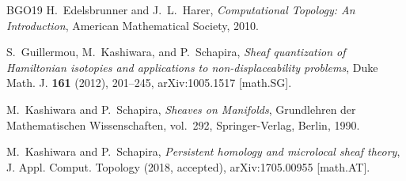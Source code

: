 \documentclass[12pt,a4paper]{amsart}
\theoremstyle{definition}
\begin{document}
\begin{thebibliography}{BGO19}
H.~Edelsbrunner and J.~L.~Harer,
\textit{Computational Topology: An Introduction},
American Mathematical Society, 2010.

S.~Guillermou, M.~Kashiwara, and P.~Schapira,
\textit{Sheaf quantization of Hamiltonian isotopies and applications to
non-displaceability problems},
Duke Math. J. \textbf{161} (2012), 201--245,
arXiv:1005.1517 [math.SG].

M.~Kashiwara and P.~Schapira,
\textit{Sheaves on Manifolds},
Grundlehren der Mathematischen Wissenschaften, vol.~292,
Springer-Verlag, Berlin, 1990.

M.~Kashiwara and P.~Schapira,
\textit{Persistent homology and microlocal sheaf theory},
J. Appl. Comput. Topology (2018, accepted),
arXiv:1705.00955 [math.AT].

\end{thebibliography}
\end{document}
